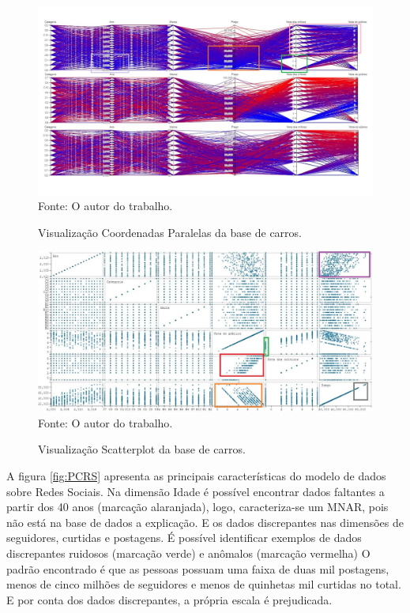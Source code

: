 \documentclass[
	12pt,				%
	openright,			%
	oneside,			%
	a4paper,			%
	english,			%
	brazil				%
	]{abntex2}
\begin{document}
	\begin{figure}[h!]
		\centering
		\caption{Visualização Coordenadas Paralelas da base de carros.}
		\includegraphics[width=\linewidth]{./figures/Resultados/PCCarros.png}
		\label{fig:PCCarros}
		\footnotesize Fonte: O autor do trabalho.
	\end{figure}

	\begin{figure}[h!]
		\centering
		\caption{Visualização Scatterplot da base de carros.}
		\includegraphics[width=\linewidth]{./figures/Resultados/ScatterPlotC.jpg}
		\label{fig:ScatterPlotC}
		\footnotesize Fonte: O autor do trabalho.
	\end{figure}

	A figura \ref{fig:PCRS} apresenta as principais características do modelo de dados sobre Redes Sociais.
	Na dimensão Idade é possível encontrar dados faltantes a partir dos 40 anos (marcação alaranjada), logo, caracteriza-se um MNAR, pois não está na base de dados a explicação.
	E os dados discrepantes nas dimensões de seguidores, curtidas e postagens.
	É possível identificar exemplos de dados discrepantes ruidosos (marcação verde) e anômalos (marcação vermelha)
	O padrão encontrado é que as pessoas possuam uma faixa de duas mil postagens, menos de cinco milhões de seguidores e menos de quinhetas mil curtidas no total.
	E por conta dos dados discrepantes, a própria escala é prejudicada.
	\par
\end{document}

